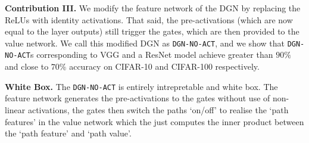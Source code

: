 \textbf{Contribution III.} We modify the feature network of the DGN by replacing the ReLUs with identity activations. That said, the pre-activations (which are now equal to the layer outputs) still trigger the gates, which are then provided to the value network. We call this modified DGN as \texttt{DGN-NO-ACT}, and we show that \texttt{DGN-NO-ACT}s corresponding to VGG and a ResNet model achieve greater than $90\%$ and close to $70\%$ accuracy on CIFAR-10 and CIFAR-100 respectively. 

\textbf{White Box.} The \texttt{DGN-NO-ACT} is entirely intrepretable and white box. The feature network generates the pre-activations to the gates without use of non-linear activations, the gates then switch the paths `on/off' to realise the `path features' in the value network which the just computes the inner product between the `path feature' and `path value'.







